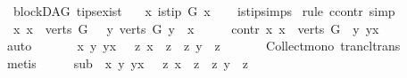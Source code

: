 \begin{isabellebody}
{\isafolddocument}%
%
\isadelimdocument
%
\endisadelimdocument
{}\isamarkupfalse%
\ {\isacharparenleft}{\kern0pt}\ blockDAG{\isacharparenright}{\kern0pt}\ tips{\isacharunderscore}{\kern0pt}exist{\isacharcolon}{\kern0pt}\ \isanewline
\ \ {\isachardoublequoteopen}{\isasymexists}x{\isachardot}{\kern0pt}\ is{\isacharunderscore}{\kern0pt}tip\ G\ x{\isachardoublequoteclose}\isanewline
%
\isadelimproof
\ \ %
\endisadelimproof
%
\isatagproof
{}\isamarkupfalse%
\ is{\isacharunderscore}{\kern0pt}tip{\isachardot}{\kern0pt}simps\isanewline
{}\isamarkupfalse%
\ {\isacharparenleft}{\kern0pt}rule\ ccontr{\isacharcomma}{\kern0pt}\ simp{\isacharparenright}{\kern0pt}\isanewline
\ \ \isamarkupfalse%
\ {\isachardoublequoteopen}\ {\isasymforall}x{\isachardot}{\kern0pt}\ x\ {\isasymin}\ verts\ G\ {\isasymlongrightarrow}\ {\isacharparenleft}{\kern0pt}{\isasymexists}\ y\ {\isasymin}verts\ G{\isachardot}{\kern0pt}\ y\ {\isasymrightarrow}\isactrlsup {\isacharplus}{\kern0pt}\ x{\isacharparenright}{\kern0pt}{\isachardoublequoteclose}\isanewline
\ \ \isamarkupfalse%
\ \isamarkupfalse%
\ contr{\isacharcolon}{\kern0pt}\ {\isachardoublequoteopen}{\isasymforall}x{\isachardot}{\kern0pt}\ x\ {\isasymin}\ verts\ G\ {\isasymlongrightarrow}\ {\isacharparenleft}{\kern0pt}{\isasymexists}y{\isachardot}{\kern0pt}\ y{\isasymrightarrow}\isactrlsup {\isacharplus}{\kern0pt}x{\isacharparenright}{\kern0pt}{\isachardoublequoteclose}\isanewline
\ \ \ \ \isamarkupfalse%
\ auto\ \ \isanewline
\ \ \isamarkupfalse%
\ {\isachardoublequoteopen}{\isasymforall}\ x\ y{\isachardot}{\kern0pt}\ y{\isasymrightarrow}\isactrlsup {\isacharplus}{\kern0pt}x\ {\isasymlongrightarrow}\ \ {\isacharbraceleft}{\kern0pt}z{\isachardot}{\kern0pt}\ x\ {\isasymrightarrow}\isactrlsup {\isacharplus}{\kern0pt}\ z{\isacharbraceright}{\kern0pt}\ {\isasymsubseteq}\ {\isacharbraceleft}{\kern0pt}z{\isachardot}{\kern0pt}\ y\ {\isasymrightarrow}\isactrlsup {\isacharplus}{\kern0pt}\ z{\isacharbraceright}{\kern0pt}{\isachardoublequoteclose}\isanewline
\ \ \ \ \isamarkupfalse%
\ \ Collect{\isacharunderscore}{\kern0pt}mono\ trancl{\isacharunderscore}{\kern0pt}trans\isanewline
\ \ \ \ \isamarkupfalse%
\ metis\isanewline
\ \ \isamarkupfalse%
\ \isamarkupfalse%
\ sub{\isacharcolon}{\kern0pt}\ {\isachardoublequoteopen}{\isasymforall}\ x\ y{\isachardot}{\kern0pt}\ y{\isasymrightarrow}\isactrlsup {\isacharplus}{\kern0pt}x\ {\isasymlongrightarrow}\ \ {\isacharbraceleft}{\kern0pt}z{\isachardot}{\kern0pt}\ x\ {\isasymrightarrow}\isactrlsup {\isacharplus}{\kern0pt}\ z{\isacharbraceright}{\kern0pt}\ {\isasymsubset}\ {\isacharbraceleft}{\kern0pt}z{\isachardot}{\kern0pt}\ y\ {\isasymrightarrow}\isactrlsup {\isacharplus}{\kern0pt}\ z{\isacharbraceright}{\kern0pt}{\isachardoublequoteclose}\isanewline

\end{isabellebody}
